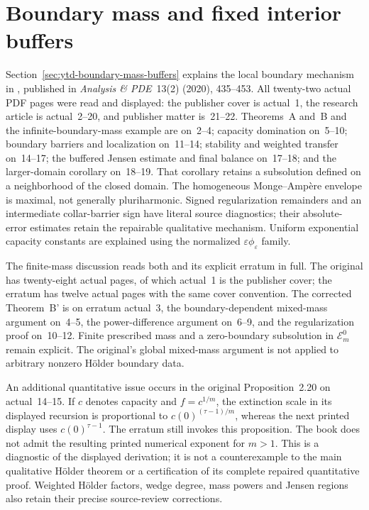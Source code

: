 \section{Boundary mass and fixed interior buffers}
\label{sec:provenance-boundary-mass-buffers}

Section~\ref{sec:ytd-boundary-mass-buffers} explains the
local boundary mechanism in
\cite{Nguyen20HolderSubsolutionIIPublished}, published in
\emph{Analysis \& PDE}~13(2) (2020), 435--453.
All twenty-two actual PDF pages were read and displayed:
the publisher cover is actual~1, the research article is
actual~2--20, and publisher matter is~21--22.
Theorems~A and~B and the infinite-boundary-mass example
are on~2--4; capacity domination on~5--10; boundary
barriers and localization on~11--14; stability and
weighted transfer on~14--17; the buffered Jensen
estimate and final balance on~17--18; and the
larger-domain corollary on~18--19. That corollary
retains a subsolution defined on a neighborhood of
the closed domain. The homogeneous Monge--Amp\`ere
envelope is maximal, not generally pluriharmonic.
Signed regularization remainders and an intermediate
collar-barrier sign have literal source diagnostics;
their absolute-error estimates retain the repairable
qualitative mechanism. Uniform exponential capacity
constants are explained using the normalized
$\varepsilon\phi_\varepsilon$ family.

The finite-mass discussion reads both
\cite{BenaliZeriahi20HolderSubsolutionPublished}
and its explicit erratum
\cite{BenaliZeriahi21HolderErratumPublished} in full.
The original has twenty-eight actual pages, of which
actual~1 is the publisher cover; the erratum has
twelve actual pages with the same cover convention.
The corrected Theorem~B' is on erratum actual~3,
the boundary-dependent mixed-mass argument on~4--5,
the power-difference argument on~6--9, and the
regularization proof on~10--12. Finite prescribed
mass and a zero-boundary subsolution in
$\mathcal E_m^0$ remain explicit. The original's
global mixed-mass argument is not applied to
arbitrary nonzero H\"older boundary data.

An additional quantitative issue occurs in the
original Proposition~2.20 on actual~14--15.
If $c$ denotes capacity and $f=c^{1/m}$, the
extinction scale in its displayed recursion is
proportional to $c(0)^{(\tau-1)/m}$, whereas the
next printed display uses $c(0)^{\tau-1}$.
The erratum still invokes this proposition.
The book does not admit the resulting printed
numerical exponent for $m>1$. This is a diagnostic
of the displayed derivation; it is not a
counterexample to the main qualitative H\"older
theorem or a certification of its complete repaired
quantitative proof. Weighted H\"older factors,
wedge degree, mass powers and Jensen regions also
retain their precise source-review corrections.

